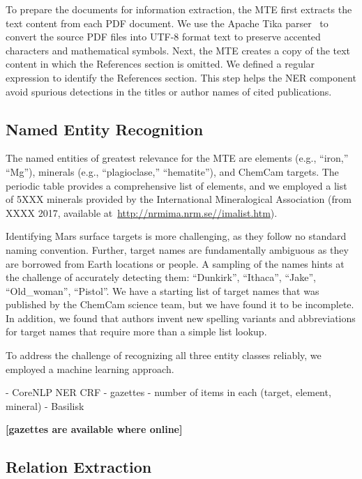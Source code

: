 \documentclass[letterpaper]{article} %
\begin{document}
To prepare the documents for information extraction, the MTE first
extracts the text content from each PDF document.  We use the Apache
Tika parser~\cite{mattmann:tika11} to convert the source PDF files
into UTF-8 format text to preserve accented characters and
mathematical symbols.
Next, the MTE creates a copy of the text content in which the
References section is omitted.  We defined a regular expression to
identify the References section.
This step helps the NER component avoid spurious detections in the
titles or author names of cited publications.

\subsection{Named Entity Recognition}

The named entities of greatest relevance for the MTE are elements
(e.g., ``iron,'' ``Mg''), minerals (e.g., ``plagioclase,''
``hematite''), and ChemCam targets.  The periodic table provides a
comprehensive list of elements, and we employed a list of 5XXX minerals
provided by the International Mineralogical Association (from XXXX
2017, available at~\url{http://nrmima.nrm.se//imalist.htm}).

Identifying Mars surface targets is more challenging, as they follow
no standard naming convention.  Further, target names are
fundamentally ambiguous as they are borrowed from Earth locations or
people.  A sampling of the names hints at the challenge of accurately
detecting them: ``Dunkirk'', ``Ithaca'', ``Jake'', ``Old\_woman'',
``Pistol''.  We have a starting list of target names that was
published by the ChemCam science team, but we have found it to be
incomplete.  In addition, we found that authors invent new spelling
variants and abbreviations for target names that require more than a
simple list lookup.

To address the challenge of recognizing all three entity classes
reliably, we employed a machine learning approach.

- CoreNLP NER CRF
- gazettes - number of items in each (target, element, mineral)
- Basilisk~\cite{thelen:basilisk02}

{\bf [gazettes are available where online]}

\subsection{Relation Extraction}
\end{document}
